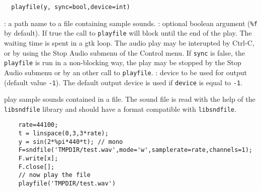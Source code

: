 
\begin{mandesc}
\end{mandesc}
\begin{calling_sequence}
\begin{verbatim}
  playfile(y, sync=bool,device=int)
\end{verbatim}
\end{calling_sequence}
\begin{parameters}
  \begin{varlist}
    : a path name to a file containing sample sounds. 
    : optional boolean argument (\verb+%f+ by default). 
    If true the call to \verb+playfile+ 
    will block until the end of the play. The waiting time is spent
    in a gtk loop. The audio play may be interupted by 
    Ctrl-C, or by using the Stop Audio submenu of the Control menu. 
    If \verb+sync+ is false, the \verb+playfile+ is run in a non-blocking way, the 
    play may be stopped by the  Stop Audio submenu or by an other call 
    to \verb+playfile+. 
   : device to be used for output (default value \verb+-1+). The default output 
   device is used if \verb+device+ is equal to \verb+-1+.
  \end{varlist}
\end{parameters}

\begin{mandescription}
  play sample sounds contained in a file. The sound file is read with 
  the help of the \verb+libsndfile+ library and should have a format compatible with 
  \verb+libsndfile+.
\end{mandescription}
\begin{examples}
  \begin{Verbatim}
    rate=44100;
    t = linspace(0,3,3*rate);
    y = sin(2*%pi*440*t); // mono 
    F=sndfile('TMPDIR/test.wav',mode='w',samplerate=rate,channels=1);
    F.write[x];
    F.close[];
    // now play the file 
    playfile('TMPDIR/test.wav')
  \end{Verbatim}
\end{examples}
\begin{manseealso}
\end{manseealso}

